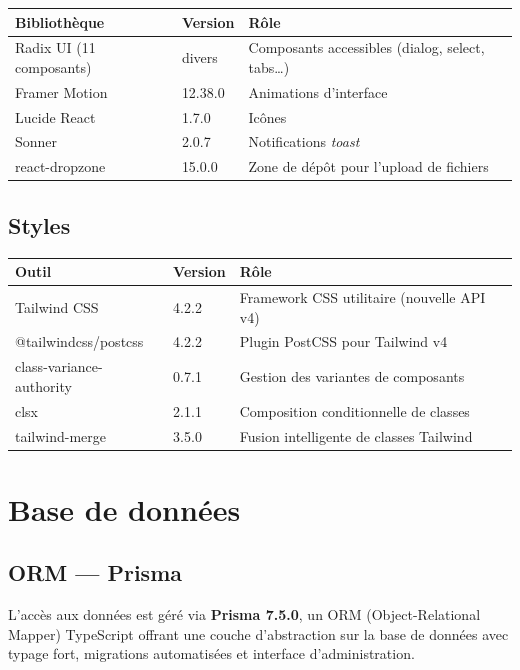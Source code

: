 \documentclass[a4paper,12pt,french]{article}
\begin{document}
\begin{tabularx}{\textwidth}{l l X}
\toprule
\textbf{Bibliothèque} & \textbf{Version} & \textbf{Rôle} \\
\midrule
Radix UI (11 composants) & divers & Composants accessibles (dialog, select, tabs…) \\
Framer Motion & 12.38.0 & Animations d'interface \\
Lucide React & 1.7.0 & Icônes \\
Sonner & 2.0.7 & Notifications \textit{toast} \\
react-dropzone & 15.0.0 & Zone de dépôt pour l'upload de fichiers \\
\bottomrule
\end{tabularx}

\subsection{Styles}

\begin{tabularx}{\textwidth}{l l X}
\toprule
\textbf{Outil} & \textbf{Version} & \textbf{Rôle} \\
\midrule
Tailwind CSS & 4.2.2 & Framework CSS utilitaire (nouvelle API v4) \\
@tailwindcss/postcss & 4.2.2 & Plugin PostCSS pour Tailwind v4 \\
class-variance-authority & 0.7.1 & Gestion des variantes de composants \\
clsx & 2.1.1 & Composition conditionnelle de classes \\
tailwind-merge & 3.5.0 & Fusion intelligente de classes Tailwind \\
\bottomrule
\end{tabularx}


\section{Base de données}

\subsection{ORM — Prisma}

L'accès aux données est géré via \textbf{Prisma 7.5.0}, un ORM (Object-Relational Mapper) TypeScript offrant une couche d'abstraction sur la base de données avec typage fort, migrations automatisées et interface d'administration.
\end{document}
